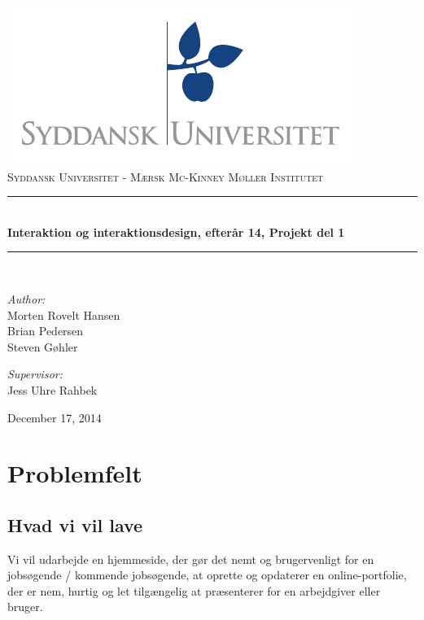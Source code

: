\documentclass[a4paper,titlepage,fleqn,12pt]{article}
\begin{document}
\begin{titlepage}
	\begin{center}
	\includegraphics[scale=1.5,page=7]{sdu_logos.pdf}~\\[0.5cm]
	\textsc{\Large{Syddansk Universitet - Mærsk Mc-Kinney Møller Institutet}} \\[0.2cm]
	\rule{12cm}{1pt} \\[0.4cm]
	{ \huge \bfseries Interaktion og interaktionsdesign, efterår 14, Projekt del 1 \\[0.4cm] }
	\rule{12cm}{1pt} \\[1.5cm]
	
	\begin{minipage}{0.4\textwidth}
		\begin{flushleft} \large
			\textit{Author:}\\
			Morten Rovelt Hansen\\
			Brian Pedersen\\
			Steven Gøhler\\
		\end{flushleft}
	\end{minipage}
	\begin{minipage}{0.4\textwidth}
		\begin{flushright} \large
			\textit{Supervisor:} \\
			Jess Uhre Rahbek
		\end{flushright}
	\end{minipage}
	
	\vfill
	
	{\large December 17, 2014}
	\end{center}
	\newpage
\end{titlepage}

\tableofcontents
\newpage

\section{Problemfelt}

\subsection{Hvad vi vil lave}
Vi vil udarbejde en hjemmeside, der gør det nemt og brugervenligt for en jobsøgende / kommende jobsøgende, at oprette og opdaterer en online-portfolie, der er nem, hurtig og let tilgængelig at præsenterer for en arbejdgiver eller bruger.
\end{document}
